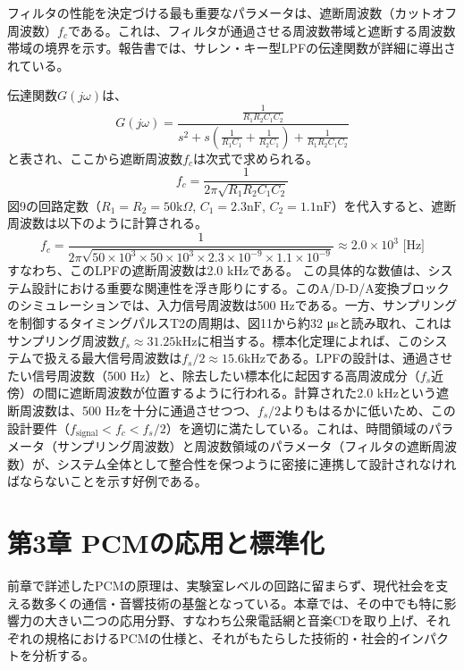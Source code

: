 \documentclass[
  a4paper,  %
  11pt,     %
]{ltjsarticle}%
\begin{document}
フィルタの性能を決定づける最も重要なパラメータは、遮断周波数（カットオフ周波数）$f_c$である。これは、フィルタが通過させる周波数帯域と遮断する周波数帯域の境界を示す。報告書では、サレン・キー型LPFの伝達関数が詳細に導出されている\cite{ref1}。

伝達関数$G(j\omega)$は、
\begin{equation}
  G(j\omega) = \frac{\frac{1}{R_1 R_2 C_1 C_2}}{s^2 + s(\frac{1}{R_1 C_1} + \frac{1}{R_2 C_1}) + \frac{1}{R_1 R_2 C_1 C_2}}
\end{equation}
と表され、ここから遮断周波数$f_c$は次式で求められる。
\begin{equation}
  f_c = \frac{1}{2\pi\sqrt{R_1 R_2 C_1 C_2}}
\end{equation}
図9の回路定数（$R_1=R_2=50 \text{k}\Omega$, $C_1=2.3 \text{nF}$, $C_2=1.1 \text{nF}$）を代入すると、遮断周波数は以下のように計算される\cite{ref1}。
\begin{equation}
  f_c = \frac{1}{2\pi\sqrt{50 \times 10^3 \times 50 \times 10^3 \times 2.3 \times 10^{-9} \times 1.1 \times 10^{-9}}} \approx 2.0 \times 10^3 \text{ [Hz]}
\end{equation}
すなわち、このLPFの遮断周波数は2.0 kHzである。
この具体的な数値は、システム設計における重要な関連性を浮き彫りにする。このA/D-D/A変換ブロックのシミュレーションでは、入力信号周波数は500 Hzである\cite{ref1}。一方、サンプリングを制御するタイミングパルスT2の周期は、図11から約32 μsと読み取れ、これはサンプリング周波数$f_s \approx 31.25 \text{kHz}$に相当する。標本化定理によれば、このシステムで扱える最大信号周波数は$f_s/2 \approx 15.6 \text{kHz}$である。LPFの設計は、通過させたい信号周波数（500 Hz）と、除去したい標本化に起因する高周波成分（$f_s$近傍）の間に遮断周波数が位置するように行われる。計算された2.0 kHzという遮断周波数は、500 Hzを十分に通過させつつ、$f_s/2$よりもはるかに低いため、この設計要件（$f_{\text{signal}} < f_c < f_s/2$）を適切に満たしている。これは、時間領域のパラメータ（サンプリング周波数）と周波数領域のパラメータ（フィルタの遮断周波数）が、システム全体として整合性を保つように密接に連携して設計されなければならないことを示す好例である。

\section{第3章 PCMの応用と標準化}

前章で詳述したPCMの原理は、実験室レベルの回路に留まらず、現代社会を支える数多くの通信・音響技術の基盤となっている。本章では、その中でも特に影響力の大きい二つの応用分野、すなわち公衆電話網と音楽CDを取り上げ、それぞれの規格におけるPCMの仕様と、それがもたらした技術的・社会的インパクトを分析する。
\end{document}
